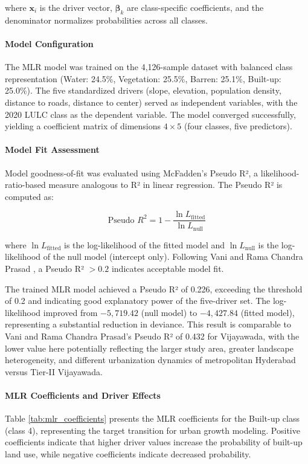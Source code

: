 \documentclass[12pt,a4paper]{article}
\begin{document}
where $\mathbf{x}_i$ is the driver vector, $\boldsymbol{\beta}_k$ 
are class-specific coefficients, and the denominator normalizes 
probabilities across all classes.
\paragraph{Model Configuration}
The MLR model was trained on the 4,126-sample dataset with balanced class representation (Water: 24.5\%, Vegetation: 25.5\%, Barren: 25.1\%, Built-up: 25.0\%). The five standardized drivers (slope, elevation, population density, distance to roads, distance to center) served as independent variables, with the 2020 LULC class as the dependent variable. The model converged successfully, yielding a coefficient matrix of dimensions $4 \times 5$ (four classes, five predictors).

\paragraph{Model Fit Assessment}
Model goodness-of-fit was evaluated using McFadden's Pseudo R², a likelihood-ratio-based measure analogous to R² in linear regression. The Pseudo R² is computed as:

\begin{equation}
\text{Pseudo } R^2 = 1 - \frac{\ln L_{\text{fitted}}}{\ln L_{\text{null}}}
\label{eq:pseudo_r2}
\end{equation}

where $\ln L_{\text{fitted}}$ is the log-likelihood of the fitted model and $\ln L_{\text{null}}$ is the log-likelihood of the null model (intercept only). Following Vani and Rama Chandra Prasad \cite{vani2022}, a Pseudo R² $> 0.2$ indicates acceptable model fit.

The trained MLR model achieved a Pseudo R² of 0.226, exceeding the threshold of 0.2 and indicating good explanatory power of the five-driver set. The log-likelihood improved from $-5,719.42$ (null model) to $-4,427.84$ (fitted model), representing a substantial reduction in deviance. This result is comparable to Vani and Rama Chandra Prasad's \cite{vani2022} Pseudo R² of 0.432 for Vijayawada, with the lower value here potentially reflecting the larger study area, greater landscape heterogeneity, and different urbanization dynamics of metropolitan Hyderabad versus Tier-II Vijayawada.

\paragraph{MLR Coefficients and Driver Effects}
Table \ref{tab:mlr_coefficients} presents the MLR coefficients for the Built-up class (class 4), representing the target transition for urban growth modeling. Positive coefficients indicate that higher driver values increase the probability of built-up land use, while negative coefficients indicate decreased probability.
\end{document}
